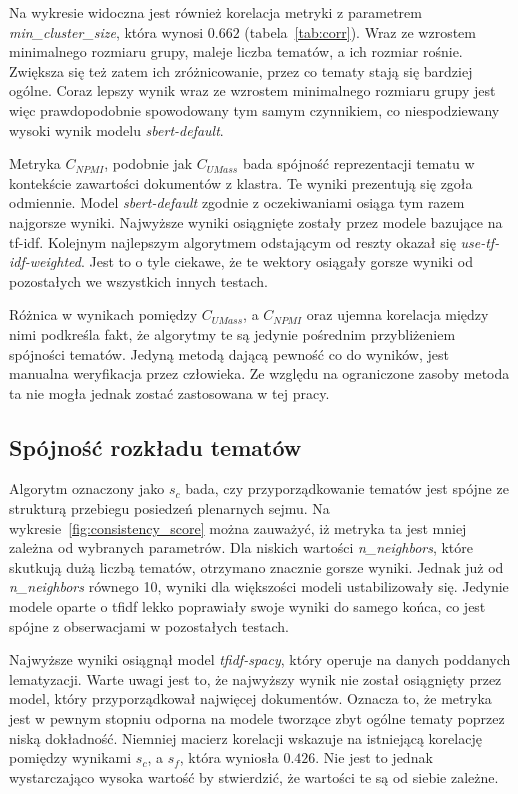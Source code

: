 		Na wykresie widoczna jest również korelacja metryki z parametrem \emph{min\_cluster\_size}, która wynosi \(0.662\) (tabela~\ref{tab:corr}).
		Wraz ze wzrostem minimalnego rozmiaru grupy, maleje liczba tematów, a ich rozmiar rośnie.
		Zwiększa się też zatem ich zróżnicowanie, przez co tematy stają się bardziej ogólne.
		Coraz lepszy wynik wraz ze wzrostem minimalnego rozmiaru grupy jest więc prawdopodobnie spowodowany tym samym czynnikiem,
			co niespodziewany wysoki wynik modelu \emph{sbert-default}.

		Metryka \(C_{NPMI}\), podobnie jak \(C_{UMass}\) bada spójność reprezentacji tematu w kontekście zawartości dokumentów z klastra.
		Te wyniki prezentują się zgoła odmiennie.
		Model \emph{sbert-default} zgodnie z oczekiwaniami osiąga tym razem najgorsze wyniki.
		Najwyższe wyniki osiągnięte zostały przez modele bazujące na tf-idf.
		Kolejnym najlepszym algorytmem odstającym od reszty okazał się \emph{use-tf-idf-weighted}.
		Jest to o tyle ciekawe, że te wektory osiągały gorsze wyniki od pozostałych we wszystkich innych testach.

		Różnica w wynikach pomiędzy \(C_{UMass}\), a \(C_{NPMI}\) oraz ujemna korelacja między nimi podkreśla fakt, że algorytmy te są jedynie pośrednim przybliżeniem spójności tematów.
		Jedyną metodą dającą pewność co do wyników, jest manualna weryfikacja przez człowieka.
		Ze względu na ograniczone zasoby metoda ta nie mogła jednak zostać zastosowana w tej pracy.

	\subsection{Spójność rozkładu tematów}
		Algorytm oznaczony jako \(s_c\) bada, czy przyporządkowanie tematów jest spójne ze strukturą przebiegu posiedzeń plenarnych sejmu.
		Na wykresie~\ref{fig:consistency_score} można zauważyć, iż metryka ta jest mniej zależna od wybranych parametrów.
		Dla niskich wartości \emph{n\_neighbors}, które skutkują dużą liczbą tematów, otrzymano znacznie gorsze wyniki.
		Jednak już od \emph{n\_neighbors} równego 10, wyniki dla większości modeli ustabilizowały się.
		Jedynie modele oparte o tfidf lekko poprawiały swoje wyniki do samego końca, co jest spójne z obserwacjami w pozostałych testach.

		Najwyższe wyniki osiągnął model \emph{tfidf-spacy}, który operuje na danych poddanych lematyzacji.
		Warte uwagi jest to, że najwyższy wynik nie został osiągnięty przez model, który przyporządkował najwięcej dokumentów.
		Oznacza to, że metryka jest w pewnym stopniu odporna na modele tworzące zbyt ogólne tematy poprzez niską dokładność.
		Niemniej macierz korelacji wskazuje na istniejącą korelację pomiędzy wynikami \(s_c\), a \(s_f\), która wyniosła \(0.426\).
		Nie jest to jednak wystarczająco wysoka wartość by stwierdzić, że wartości te są od siebie zależne.

